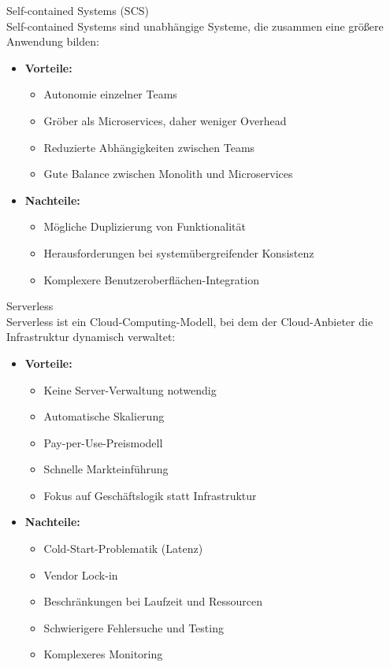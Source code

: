 \begin{concept}{Self-contained Systems (SCS)}\\
    Self-contained Systems sind unabhängige Systeme, die zusammen eine größere Anwendung bilden:
    \begin{itemize}
        \item \textbf{Vorteile:}
        \begin{itemize}
            \item Autonomie einzelner Teams
            \item Gröber als Microservices, daher weniger Overhead
            \item Reduzierte Abhängigkeiten zwischen Teams
            \item Gute Balance zwischen Monolith und Microservices
        \end{itemize}
        
        \item \textbf{Nachteile:}
        \begin{itemize}
            \item Mögliche Duplizierung von Funktionalität
            \item Herausforderungen bei systemübergreifender Konsistenz
            \item Komplexere Benutzeroberflächen-Integration
        \end{itemize}
    \end{itemize}
\end{concept}

\begin{concept}{Serverless}\\
    Serverless ist ein Cloud-Computing-Modell, bei dem der Cloud-Anbieter die Infrastruktur dynamisch verwaltet:
    \begin{itemize}
        \item \textbf{Vorteile:}
        \begin{itemize}
            \item Keine Server-Verwaltung notwendig
            \item Automatische Skalierung
            \item Pay-per-Use-Preismodell
            \item Schnelle Markteinführung
            \item Fokus auf Geschäftslogik statt Infrastruktur
        \end{itemize}
        
        \item \textbf{Nachteile:}
        \begin{itemize}
            \item Cold-Start-Problematik (Latenz)
            \item Vendor Lock-in
            \item Beschränkungen bei Laufzeit und Ressourcen
            \item Schwierigere Fehlersuche und Testing
            \item Komplexeres Monitoring
        \end{itemize}
    \end{itemize}
\end{concept}

